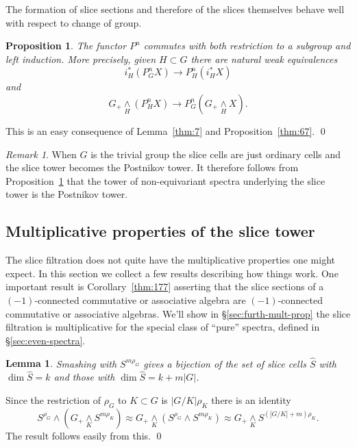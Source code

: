 \documentclass{amsart}
\newtheorem{lem}[equation]{Lemma}
\newtheorem{prop}[equation]{Proposition}
\newtheorem{rem}[equation]{Remark}
\theoremstyle{definition}
\theoremstyle{remark}
\newtheorem{rem}[equation]{Remark}
\newenvironment{pf}{\bigskip{\em Proof:\/}}{\qed\medskip}
\newcommand{\smashove}[1]{\underset{#1}{\wedge}}
\newcommand{\slicecell}{\widehat{S}}
\begin{document}
The formation of slice sections and therefore of the slices themselves
behave well with respect to change of group.

\begin{prop}
\label{thm:26} 
The functor $P^{n}$ commutes with both restriction to a
subgroup and left induction.  More precisely, given $H\subset G$ there
are natural weak equivalences
\[
i_{H}^{\ast}(P^{n}_{G}X) \to P^{n}_{H}(i_{H}^{\ast}X)
\]
and
\[
G_{+}\smashove{H} (P^{n}_{H}X)\to P^{n}_{G}(G_{+}\smashove{H}X).
\]
\end{prop}

\begin{pf}
This is an easy consequence of Lemma~\ref{thm:7} and Proposition~\ref{thm:67}.
\end{pf}

\begin{rem}
\label{rem:14}
When $G$ is the trivial group the slice cells are just ordinary cells
and the slice tower becomes the Postnikov tower.
It therefore follows from Proposition~\ref{thm:26} that the tower of
non-equivariant spectra underlying the slice tower is the Postnikov tower.
\end{rem}

\subsection{Multiplicative properties of the slice tower}
\label{sec:mult-prop-slice}

The slice filtration does not quite have the multiplicative properties
one might expect.  In this section we collect a few results describing
how things work.  One important result is Corollary~\ref{thm:177}
asserting that the slice sections of a $(-1)$-connected commutative or
associative algebra are $(-1)$-connected commutative or associative
algebras.  We'll show in \S\ref{sec:furth-mult-prop} the slice
filtration is multiplicative for the special class of ``pure''
spectra, defined in \S\ref{sec:even-spectra}.

\begin{lem}
\label{thm:71} Smashing with $S^{m\rho_{G}}$ gives a bijection of the
set of slice cells $\slicecell$ with $\dim \slicecell=k$ and those with
$\dim \slicecell=k+m|G|$.
\end{lem}

\begin{pf}
Since the restriction of $\rho_{G}$ to $K\subset G$ is $|G/K|\rho_{K}$ there is
an identity 
\[
S^{\rho_{G}}\wedge (G_{+}\smashove{K}S^{m\rho_{K}}) \approx 
G_{+}\smashove{K}(S^{\rho_{G}}\wedge S^{m\rho_{K}}) \approx 
G_{+}\smashove{K} S^{(|G/K|+m)\rho_{K}}.
\]
The result follows easily from this.
\end{pf}
\end{document}
